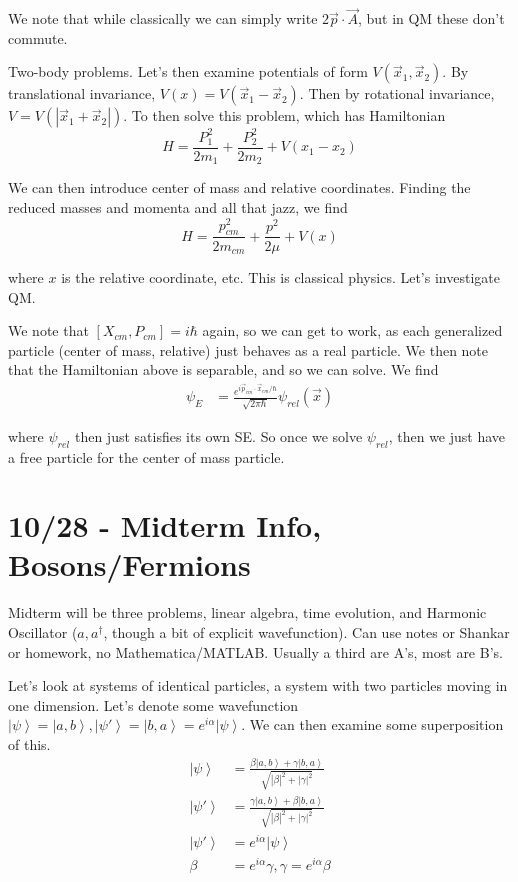 \documentclass[10pt]{report}
\newcommand{\ket}[1]{\left|#1\right>}
\newcommand{\abs}[1]{\left|#1\right|}
\begin{document}
We note that while classically we can simply write $2\vec{p}\cdot \vec{A}$, but in QM these don't commute.

Two-body problems. Let's then examine potentials of form $V(\vec{x}_1, \vec{x}_2)$. By translational invariance, $V(x) = V\left( \vec{x}_1 - \vec{x}_2 \right)$. Then by rotational invariance, $V = V\left( \abs{\vec{x}_1 + \vec{x}_2} \right)$. To then solve this problem, which has Hamiltonian
$$H = \frac{P_1^2}{2m_1} + \frac{P_2^2}{2m_2} + V(x_1 - x_2)$$

We can then introduce center of mass and relative coordinates. Finding the reduced masses and momenta and all that jazz, we find
$$H = \frac{p_{cm}^2}{2m_{cm}} + \frac{p^2}{2\mu} + V(x)$$

where $x$ is the relative coordinate, etc. This is classical physics. Let's investigate QM.

We note that $\left[ X_{cm}, P_{cm} \right] = i\hbar$ again, so we can get to work, as each generalized particle (center of mass, relative) just behaves as a real particle. We then note that the Hamiltonian above is separable, and so we can solve. We find
\begin{align}
	\psi_E &= \frac{e^{i\vec{p}_{cm}\cdot \vec{x}_{cm}/\hbar}}{\sqrt{2\pi\hbar}} \psi_{rel}\left( \vec{x} \right)
\end{align}

where $\psi_{rel}$ then just satisfies its own SE. So once we solve $\psi_{rel}$, then we just have a free particle for the center of mass particle.

\chapter*{10/28 - Midterm Info, Bosons/Fermions}

Midterm will be three problems, linear algebra, time evolution, and Harmonic Oscillator ($a,a^\dagger$, though a bit of explicit wavefunction). Can use notes or Shankar or homework, no Mathematica/MATLAB. Usually a third are A's, most are B's. 

Let's look at systems of identical particles, a system with two particles moving in one dimension. Let's denote some wavefunction $\ket{\psi} = \ket{a,b} , \ket{\psi'}= \ket{b,a} = e^{i\alpha}\ket{\psi}$. We can then examine some superposition of this. 
\begin{align}
	\ket{\psi} &= \frac{\beta\ket{a,b} + \gamma\ket{b,a}}{\sqrt{\abs{\beta}^2 + \abs{\gamma}^2}}\\
	\ket{\psi'} &= \frac{\gamma\ket{a,b} + \beta\ket{b,a}}{\sqrt{\abs{\beta}^2 + \abs{\gamma}^2}}\\
	\ket{\psi'} &= e^{i\alpha}\ket{\psi}\\
	\beta &= e^{i\alpha}\gamma, \gamma = e^{i\alpha}\beta
\end{align}
\end{document}
